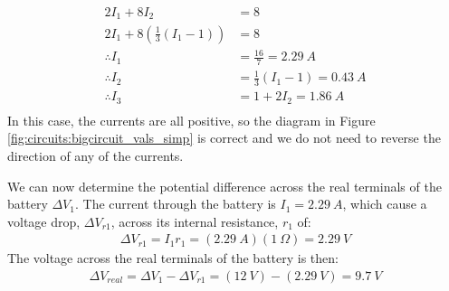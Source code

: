 \begin{example}
\begin{align*}
2I_1+8I_2&=8\\
2I_1+8\left(\frac{1}{3}(I_1-1) \right)&=8\\
\therefore I_1&=\frac{16}{7}=\SI{2.29}{A}\\
\therefore I_2&=\frac{1}{3}(I_1-1)=\SI{0.43}{A}\\
\therefore I_3&=1+2I_2=\SI{1.86}{A}\\
\end{align*}
In this case, the currents are all positive, so the diagram in Figure \ref{fig:circuits:bigcircuit_vals_simp} is correct and we do not need to reverse the direction of any of the currents. 

We can now determine the potential difference across the real terminals of the battery $\Delta V_1$. The current through the battery is $I_1=\SI{2.29}{A}$, which cause a voltage drop, $\Delta V_{r1}$, across its internal resistance, $r_1$ of:
\begin{align*}
\Delta V_{r1}=I_1r_1=(\SI{2.29}{A})(\SI{1}{\Omega})=\SI{2.29}{V}
\end{align*} 
The voltage across the real terminals of the battery is then:
\begin{align*}
\Delta V_{real}=\Delta V_1-\Delta V_{r1}=(\SI{12}{V})-(\SI{2.29}{V})=\SI{9.7}{V}
\end{align*}


\end{example}
